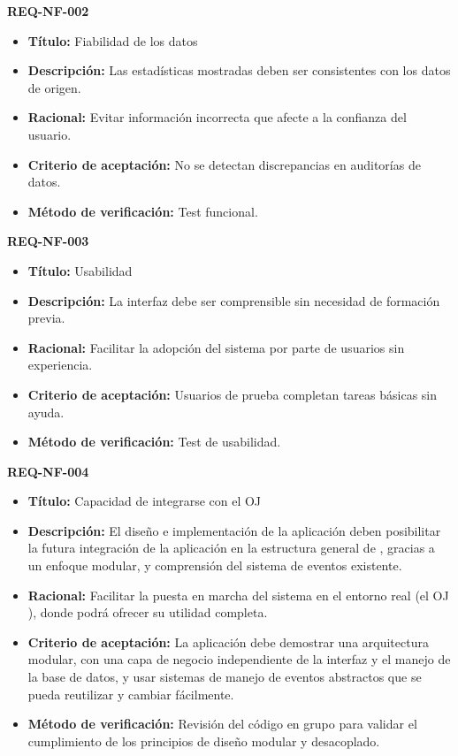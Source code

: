 \textbf{REQ-NF-002}
\label{req:REQ-NF-002}
\begin{itemize}
    \item \textbf{Título:} Fiabilidad de los datos
    \item \textbf{Descripción:} Las estadísticas mostradas deben ser consistentes con los datos de origen.
    \item \textbf{Racional:} Evitar información incorrecta que afecte a la confianza del usuario.
    \item \textbf{Criterio de aceptación:} No se detectan discrepancias en auditorías de datos.
    \item \textbf{Método de verificación:} Test funcional.
\end{itemize}

\textbf{REQ-NF-003}
\label{req:REQ-NF-003}
\begin{itemize}
    \item \textbf{Título:} Usabilidad
    \item \textbf{Descripción:} La interfaz debe ser comprensible sin necesidad de formación previa.
    \item \textbf{Racional:} Facilitar la adopción del sistema por parte de usuarios sin experiencia.
    \item \textbf{Criterio de aceptación:} Usuarios de prueba completan tareas básicas sin ayuda.
    \item \textbf{Método de verificación:} Test de usabilidad.
\end{itemize}

\textbf{REQ-NF-004}
\label{req:REQ-NF-004}
\begin{itemize}
    \item \textbf{Título:} Capacidad de integrarse con el OJ \aer
    \item \textbf{Descripción:} El diseño e implementación de la aplicación deben posibilitar la futura integración de la aplicación en la estructura general de \aer, gracias a un enfoque modular, y comprensión del sistema de eventos existente.
    \item \textbf{Racional:} Facilitar la puesta en marcha del sistema en el entorno real (el OJ \aer), donde podrá ofrecer su utilidad completa.
    \item \textbf{Criterio de aceptación:} La aplicación debe demostrar una arquitectura modular, con una capa de negocio independiente de la interfaz y el manejo de la base de datos, y usar sistemas de manejo de eventos abstractos que se pueda reutilizar y cambiar fácilmente. 
    \item \textbf{Método de verificación:} Revisión del código en grupo para validar el cumplimiento de los principios de diseño modular y desacoplado.
\end{itemize}

